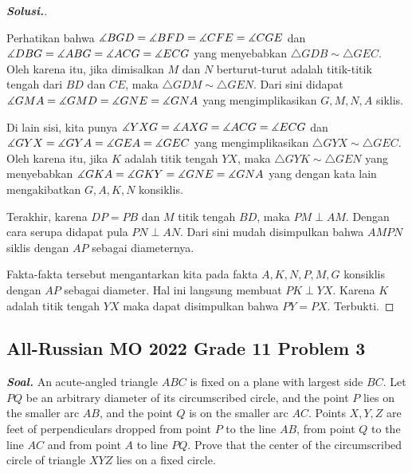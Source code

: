 \documentclass[letterpaper, 13pt]{scrartcl}
\begin{document}
\begin{proof}[\textbf{Solusi.}]
\begin{center}
\end{center}

    Perhatikan bahwa $\measuredangle BGD = \measuredangle BFD = \measuredangle CFE = \measuredangle CGE$ dan $\measuredangle DBG = \measuredangle ABG = \measuredangle ACG = \measuredangle ECG$ yang menyebabkan $\triangle GDB \sim \triangle GEC$. Oleh karena itu, jika dimisalkan $M$ dan $N$ berturut-turut adalah titik-titik tengah dari $BD$ dan $CE$, maka $\triangle GDM \sim \triangle GEN$. Dari sini didapat $\measuredangle GMA = \measuredangle GMD = \measuredangle GNE = \measuredangle GNA$ yang mengimplikasikan $G,M,N,A$ siklis. 

    Di lain sisi, kita punya $\measuredangle YXG = \measuredangle AXG = \measuredangle ACG = \measuredangle ECG$ dan $\measuredangle GYX = \measuredangle GYA = \measuredangle GEA = \measuredangle GEC$ yang mengimplikasikan $\triangle GYX \sim \triangle GEC$. Oleh karena itu, jika $K$ adalah titik tengah $YX$, maka $\triangle GYK \sim \triangle GEN$ yang menyebabkan $\measuredangle GKA = \measuredangle GKY = \measuredangle GNE = \measuredangle GNA$ yang dengan kata lain mengakibatkan $G,A,K,N$ konsiklis.

    Terakhir, karena $DP=PB$ dan $M$ titik tengah $BD$, maka $PM \perp AM$. Dengan cara serupa didapat pula $PN \perp AN$. Dari sini mudah disimpulkan bahwa $AMPN$ siklis dengan $AP$ sebagai diameternya.
    
    Fakta-fakta tersebut mengantarkan kita pada fakta $A,K,N,P,M,G$ konsiklis dengan $AP$ sebagai diameter. Hal ini langsung membuat $PK \perp YX$. Karena $K$ adalah titik tengah $YX$ maka dapat disimpulkan bahwa $PY=PX$. Terbukti.
\end{proof}

\subsection{All-Russian MO 2022 Grade 11 Problem 3}

\textbf{\textit{Soal. }}An acute-angled triangle $ABC$ is fixed on a plane with largest side $BC$. Let $PQ$ be an arbitrary diameter of its circumscribed circle, and the point $P$ lies on the smaller arc $AB$, and the point $Q$ is on the smaller arc $AC$. Points $X, Y, Z$ are feet of perpendiculars dropped from point $P$ to the line $AB$, from point $Q$ to the line $AC$ and from point $A$ to line $PQ$. Prove that the center of the circumscribed circle of triangle $XYZ$ lies on a fixed circle.
\end{document}
